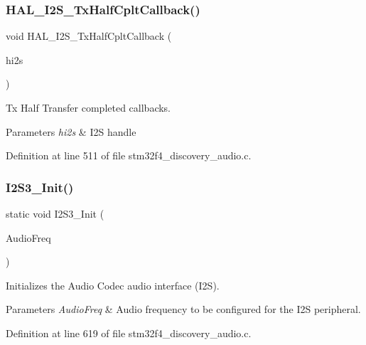 \subsubsection{\texorpdfstring{H\+A\+L\+\_\+\+I2\+S\+\_\+\+Tx\+Half\+Cplt\+Callback()}{HAL\_I2S\_TxHalfCpltCallback()}}
{\footnotesize\ttfamily void H\+A\+L\+\_\+\+I2\+S\+\_\+\+Tx\+Half\+Cplt\+Callback (\begin{DoxyParamCaption}\item[{I2\+S\+\_\+\+Handle\+Type\+Def $\ast$}]{hi2s }\end{DoxyParamCaption})}



Tx Half Transfer completed callbacks. 


\begin{DoxyParams}{Parameters}
{\em hi2s} & I2S handle \\
\hline
\end{DoxyParams}


Definition at line 511 of file stm32f4\+\_\+discovery\+\_\+audio.\+c.

\mbox{\label{group___s_t_m32_f4___d_i_s_c_o_v_e_r_y___a_u_d_i_o___o_u_t___private___functions_ga0d2acde9244d0d7b938dc22ec689884d}} 
\subsubsection{\texorpdfstring{I2\+S3\+\_\+\+Init()}{I2S3\_Init()}}
{\footnotesize\ttfamily static void I2\+S3\+\_\+\+Init (\begin{DoxyParamCaption}\item[{uint32\+\_\+t}]{Audio\+Freq }\end{DoxyParamCaption})\hspace{0.3cm}{\ttfamily [static]}}



Initializes the Audio Codec audio interface (I2S). 


\begin{DoxyParams}{Parameters}
{\em Audio\+Freq} & Audio frequency to be configured for the I2S peripheral. \\
\hline
\end{DoxyParams}


Definition at line 619 of file stm32f4\+\_\+discovery\+\_\+audio.\+c.

